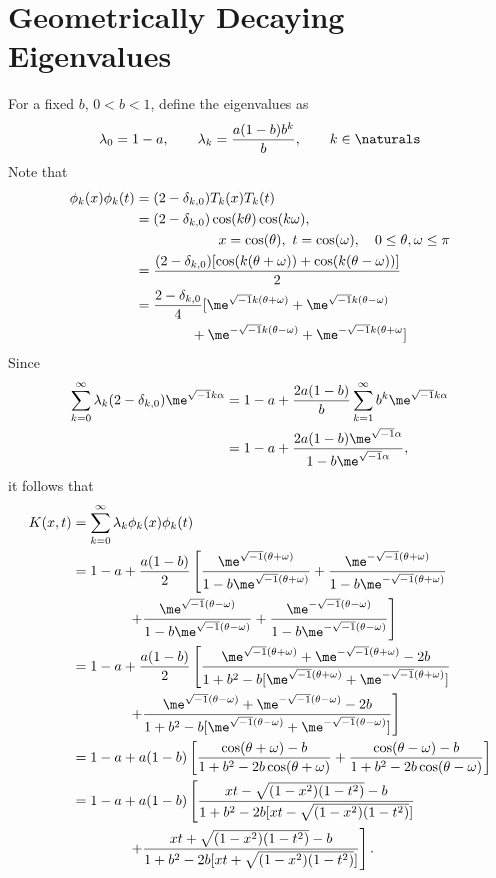 \documentclass[]{elsarticle}
\theoremstyle{definition}
\begin{document}
\section{Geometrically Decaying Eigenvalues}
For a fixed $b$, $0<b<1$, define the eigenvalues as
\begin{equation}
\lambda_0=1-a, \qquad \lambda_k = \frac{a (1-b) b^{k}}{b}, \qquad k \in \naturals
\end{equation}
Note that
\begin{align}
\nonumber
\phi_k(x)\phi_k(t) & = (2-\delta_{k,0}) T_k(x)T_k(t) \\
\nonumber
&=(2-\delta_{k,0}) \cos(k\theta)\cos(k \omega), \\
\nonumber
&\qquad \qquad \qquad x=\cos(\theta), \ t =\cos(\omega), \quad 0 \le \theta,\omega \le \pi \\
&=\frac{(2-\delta_{k,0})[\cos(k(\theta+\omega)) + \cos(k(\theta-\omega))]}{2} \label{sumcos}\\
&=\frac{2-\delta_{k,0}}{4}[\me^{\sqrt{-1}k(\theta+\omega)} + \me^{\sqrt{-1}k(\theta-\omega) } \nonumber \\
& \qquad \qquad + \me^{-\sqrt{-1}k(\theta-\omega)} + \me^{-\sqrt{-1}k(\theta+\omega}]
\label{sumcompexp}
\end{align}
Since
\begin{align*}
\sum_{k=0}^{\infty} \lambda_k (2-\delta_{k,0}) \me^{\sqrt{-1}k\alpha}
&= 1-a + \frac{2a(1-b)}{b}\sum_{k=1}^{\infty} b^k \me^{\sqrt{-1}k\alpha} \\
&= 1-a + \frac{2a(1-b)\me^{\sqrt{-1}\alpha}} {1-b\me^{\sqrt{-1}\alpha}},
\end{align*}
it follows that
\begin{align*}
K(x,t) &= \sum_{k=0}^{\infty} \lambda_k \phi_k(x)\phi_k(t) \\
&= 1-a + \frac{a(1-b)}{2}\left[ \frac{\me^{\sqrt{-1}(\theta+\omega)}}{1-b\me^{\sqrt{-1}(\theta+\omega)}} + \frac{\me^{-\sqrt{-1}(\theta+\omega)}}{1-b\me^{-\sqrt{-1}(\theta+\omega)}} \right . \\
& \qquad \qquad \left . + \frac{\me^{\sqrt{-1}(\theta-\omega)}}{1-b\me^{\sqrt{-1}(\theta-\omega)}} + \frac{\me^{-\sqrt{-1}(\theta-\omega)}}{1-b\me^{-\sqrt{-1}(\theta-\omega)}}  \right] \\
&=  1-a + \frac{a(1-b)}{2} \left[ \frac{\me^{\sqrt{-1}(\theta+\omega)} + \me^{-\sqrt{-1}(\theta+\omega)} - 2b } {1+b^2 -b[\me^{\sqrt{-1}(\theta+\omega)} + \me^{-\sqrt{-1}(\theta+\omega)}] } \right . \\
& \qquad \qquad \left . + \frac{\me^{\sqrt{-1}(\theta-\omega)}+\me^{-\sqrt{-1}(\theta-\omega)} - 2b } {1+b^2 -b[\me^{\sqrt{-1}(\theta-\omega)} + \me^{-\sqrt{-1}(\theta-\omega)}] }  \right] \\
&= 1-a + a(1-b) \left[\frac{\cos(\theta+\omega)-b} {1+b^2 -2b\cos(\theta+\omega) } + \frac{\cos(\theta-\omega)-b} {1+b^2 -2b\cos(\theta-\omega) }  \right] \\
&= 1-a + a(1-b) \left[\frac{xt-\sqrt{(1-x^2)(1-t^2)}-b} {1+b^2 -2b[xt-\sqrt{(1-x^2)(1-t^2)}] } \right. \\
& \qquad \qquad \left .  + \frac{xt+\sqrt{(1-x^2)(1-t^2)}-b} {1+b^2 -2b[xt+\sqrt{(1-x^2)(1-t^2)}] }  \right].
\end{align*}
\end{document}
